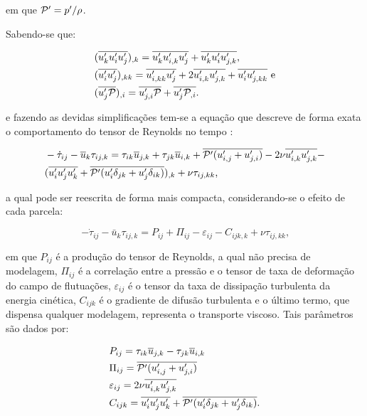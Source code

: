 \documentclass[_ArquivoPrincipal.tex]{subfiles}
\begin{document}
\noindent em que $\mathcal{P}'=p'/\rho$.

Sabendo-se que:

\begin{subequations}
    \begin{align}
         & (\overline{u'_ku'_iu'_j})_{,k}=\overline{u'_ku'_{i,k}u'_j}+\overline{u'_ku'_iu'_{j,k}}\text{,}                 \\
         & (\overline{u'_iu'_j})_{,kk}=\overline{u'_{i,kk}u'_j}+2\overline{u'_{i,k}u'_{j,k}}+\overline{u'_iu'_{j,kk}}\text{ e} \\
         & (\overline{u'_j\mathcal{P}})_{,i}=\overline{u'_{j,i}\mathcal{P}}+\overline{u'_j\mathcal{P}_{,i}}\text{.}
    \end{align}
\end{subequations}

\noindent e fazendo as devidas simplificações tem-se a equação que descreve de forma exata o comportamento do tensor de Reynolds no tempo \cite{rotta1951statistische,alfonsi2009reynolds}:

\begin{equation}
    \begin{split}
        &-\dot{\tau}_{ij}-\overline{u}_k\tau_{ij,k}=\tau_{ik}\overline{u}_{j,k}+\tau_{jk}\overline{u}_{i,k}+\overline{\mathcal{P}'(u'_{i,j}+u'_{j,i})}-2\nu\overline{u'_{i,k}u'_{j,k}}-\\
        &(\overline{u'_iu'_ju'_k}+\overline{\mathcal{P}'(u'_i\delta_{jk}+u'_j\delta_{ik})})_{,k}+\nu\tau_{ij,kk}\text{,}
    \end{split}
\end{equation}

\noindent a qual pode ser reescrita de forma mais compacta, considerando-se o efeito de cada parcela:

\begin{equation}
    -\dot{\tau}_{ij}-\bar{u}_k\tau_{ij,k}=P_{ij}+\Pi_{ij}-\varepsilon_{ij}-C_{ijk,k}+\nu\tau_{ij,kk}\text{,}
\end{equation}

\noindent em que $P_{ij}$ é a produção do tensor de Reynolds, a qual não precisa de modelagem, $\Pi_{ij}$ é a correlação entre a pressão e o tensor de taxa de deformação do campo de flutuações, $\varepsilon_{ij}$ é o tensor da taxa de dissipação turbulenta da energia cinética, $C_{ijk}$ é o gradiente de difusão turbulenta e o último termo, que dispensa qualquer modelagem, representa o transporte viscoso. Tais parâmetros são dados por:

\begin{subequations}
    \begin{align}
         & P_{ij}=\tau_{ik}\overline{u}_{j,k}-\tau_{jk}\overline{u}_{i,k}                           \\
         & \Pi_{ij}=\overline{\mathcal{P}'(u'_{i,j}+u'_{j,i})}                                         \\
         & \varepsilon_{ij}=2\nu\overline{u'_{i,k}u'_{j,k}}                                    \\
         & C_{ijk}=\overline{u'_iu'_ju'_k}+\overline{\mathcal{P}'(u'_i\delta_{jk}+u'_j\delta_{ik})}\text{.}
    \end{align}
\end{subequations}
\end{document}
